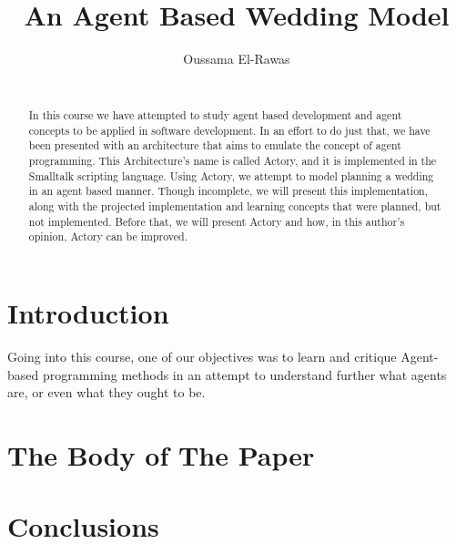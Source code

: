 \documentclass{sig-alternate}
\begin{document}
\conferenceinfo{~}{~}

\title{An Agent Based Wedding Model}


\author{
\alignauthor
Oussama El-Rawas\\
       \\
}

\maketitle
\begin{abstract}
In this course we have attempted to study agent based development and agent concepts to be applied in software development. In an effort to do just that, we have been presented with an architecture that aims to emulate the concept of agent programming. This Architecture's name is called Actory, and it is implemented in the Smalltalk scripting language. Using Actory, we attempt to model planning a wedding in an agent based manner. Though incomplete, we will present this implementation, along with the projected implementation and learning concepts that were planned, but not implemented. Before that, we will present Actory and how, in this author's opinion, Actory can be improved.
\end{abstract}


\section{Introduction}
Going into this course, one of our objectives was to learn and critique Agent-based programming methods in an attempt to understand further what agents are, or even what they ought to be.

\section{The {\secit Body} of The Paper}

\section{Conclusions}


 

\appendix
\end{document}
